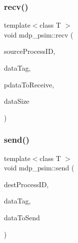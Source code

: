 \mbox{\label{classmdp__psim_ad6f523705a3744a581818b66f61522a8}} 
\subsubsection{\texorpdfstring{recv()}{recv()}\hspace{0.1cm}{\footnotesize\ttfamily [2/2]}}
{\footnotesize\ttfamily template$<$class T $>$ \\
void mdp\+\_\+psim\+::recv (\begin{DoxyParamCaption}\item[{int}]{source\+Process\+ID,  }\item[{string}]{data\+Tag,  }\item[{T $\ast$}]{pdata\+To\+Receive,  }\item[{\hyperlink{mdp__global__vars_8h_aaa1ad9d0dcd2124aa5af0120d9954174}{mdp\+\_\+int}}]{data\+Size }\end{DoxyParamCaption})\hspace{0.3cm}{\ttfamily [inline]}}

\mbox{\label{classmdp__psim_a43b6a0b7423f588033d17f49eddf37e1}} 
\subsubsection{\texorpdfstring{send()}{send()}\hspace{0.1cm}{\footnotesize\ttfamily [1/2]}}
{\footnotesize\ttfamily template$<$class T $>$ \\
void mdp\+\_\+psim\+::send (\begin{DoxyParamCaption}\item[{int}]{dest\+Process\+ID,  }\item[{string}]{data\+Tag,  }\item[{T \&}]{data\+To\+Send }\end{DoxyParamCaption})\hspace{0.3cm}{\ttfamily [inline]}}

\mbox{\label{classmdp__psim_ad63a6e9cb4f1ca2d7f75e34b03dc7da4}} 
